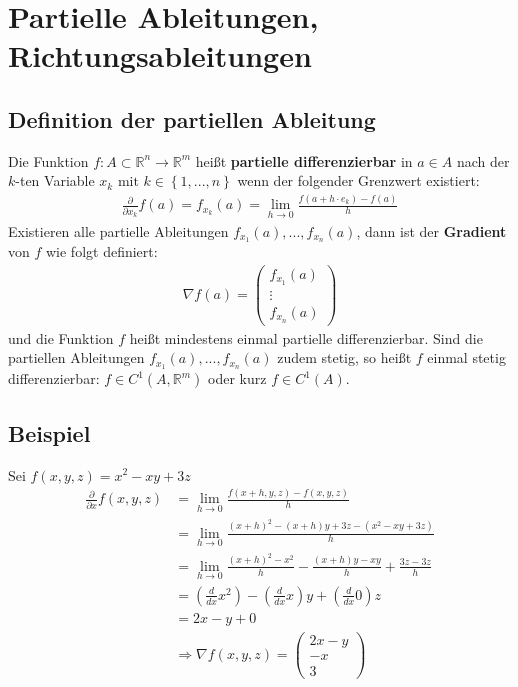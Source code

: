 \documentclass[11pt,a4paper]{book}
\newcommand {\Rn}	{\mathbb{R}^n}
\newcommand {\Rm}	{\mathbb{R}^m}
\newcommand{\1}    	{\mathbbm{1}}
\newcommand{\mitt}	{\textrm{ mit }}
\begin{document}
\section{Partielle Ableitungen, Richtungsableitungen}
\subsection{Definition der partiellen Ableitung}
Die Funktion \(f : A \subset \Rn \rightarrow \Rm\) heißt \textbf{partielle differenzierbar} in \(a \in A\) nach der \(k\)-ten Variable \(x_k \mitt k \in \left\{ 1, ..., n\right\} \) wenn der folgender Grenzwert existiert:
\begin{align*}
	\frac{\partial}{\partial x_k} f(a) = f_{x_k}(a) = \lim_{h \rightarrow 0} \frac{f(a + h \cdot e_k) - f(a)}{h}
\end{align*}
Existieren alle partielle Ableitungen \(f_{x_1}(a), ..., f_{x_n}(a)\), dann ist der \textbf{Gradient} von \(f\) wie folgt definiert:
\begin{align*}
	\nabla f(a) = \left( \begin{array}{c}
		f_{x_1} (a) \\
		\vdots \\
		f_{x_n} (a)
	\end{array} \right)
\end{align*}
und die Funktion \(f\) heißt mindestens einmal partielle differenzierbar. Sind die partiellen Ableitungen \(f_{x_1}(a), ..., f_{x_n}(a)\) zudem stetig, so heißt \(f\) einmal stetig differenzierbar: \( f \in C^1(A,\Rm)\) oder kurz \( f \in C^1(A) \).

\subsection{Beispiel}
Sei \(f(x,y,z) = x^2 - xy + 3z\)
\begin{align*}
	\frac{\partial}{\partial x} f(x,y,z) &= 
	\lim_{h \rightarrow 0} \frac{f(x+h,y,z) - f(x,y,z)}{h} \\
	&= \lim_{h \rightarrow 0} \frac{(x+h)^2 - (x+h)y + 3z - ( x^2 - xy + 3z)}{h} \\
	&= \lim_{h \rightarrow 0} \frac{(x+h)^2 - x^2}{h} - \frac{(x+h)y-xy}{h} + \frac{3z - 3z}{h} \\
	&= \left( \frac{d}{dx} x^2 \right) - \left( \frac{d}{dx} x \right)y + \left( \frac{d}{dx} 0 \right) z \\
	&= 2x - y + 0 \\
	&\Rightarrow \nabla f(x,y,z) = \left( \begin{array}{c}
		2x - y \\
		-x \\
		3	
	\end{array} \right)
\end{align*}
\end{document}
